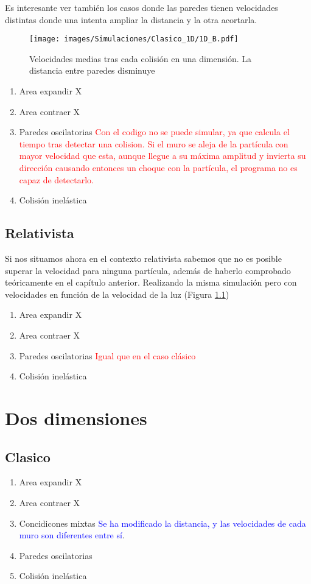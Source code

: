 \documentclass[11pt, spanish]{book}
\begin{document}
Es interesante ver también los casos donde las paredes tienen velocidades distintas donde una intenta ampliar la distancia y la otra acortarla. 

\begin{figure}[H]
    \centering
    \texttt{[image: images/Simulaciones/Clasico\_1D/1D\_B.pdf]}
    \caption{Velocidades medias tras cada colisión en una dimensión. La distancia entre paredes disminuye}
    \label{fig:1D_B}
\end{figure}
\begin{enumerate}
    \item Area expandir X
    \item Area contraer X
    \item  Paredes oscilatorias \textcolor{red}{Con el codigo no se puede simular, ya que calcula el tiempo tras detectar una colision. Si el muro se aleja de la partícula con mayor velocidad que esta, aunque llegue a su máxima amplitud y invierta su dirección causando entonces un choque con la partícula, el programa no es capaz de detectarlo.}
    \item Colisión inelástica
\end{enumerate}
\subsection{Relativista}

Si nos situamos ahora en el contexto relativista sabemos que no es posible superar la velocidad para ninguna partícula, además de haberlo comprobado teóricamente en el capítulo anterior. Realizando la misma simulación pero con velocidades en función de la velocidad de la luz (Figura \ref{})

\begin{enumerate}
    \item Area expandir X
    \item Area contraer X
    \item  Paredes oscilatorias \textcolor{red}{Igual que en el caso clásico}
    \item Colisión inelástica
\end{enumerate}
\section{Dos dimensiones}

\subsection{Clasico}
\begin{enumerate}
    \item Area expandir X
    \item Area contraer X
    \item Concidicones mixtas \textcolor{blue}{Se ha modificado la distancia, y las velocidades de cada muro son diferentes entre sí}.
    \item Paredes oscilatorias
    \item Colisión inelástica
\end{enumerate}
\end{document}
